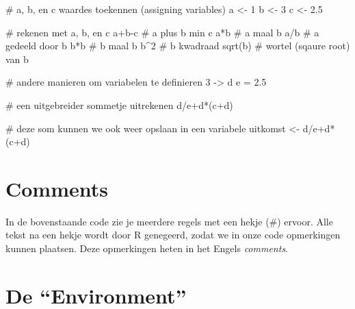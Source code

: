 \documentclass[
  a4paper,
]{scrbook}
\newenvironment{Shaded}{\begin{snugshade}}{\end{snugshade}}
\newcommand{\CommentTok}[1]{\textcolor[rgb]{0.37,0.37,0.37}{#1}}
\newcommand{\DecValTok}[1]{\textcolor[rgb]{0.68,0.00,0.00}{#1}}
\newcommand{\FloatTok}[1]{\textcolor[rgb]{0.68,0.00,0.00}{#1}}
\newcommand{\FunctionTok}[1]{\textcolor[rgb]{0.28,0.35,0.67}{#1}}
\newcommand{\NormalTok}[1]{\textcolor[rgb]{0.00,0.23,0.31}{#1}}
\newcommand{\OtherTok}[1]{\textcolor[rgb]{0.00,0.23,0.31}{#1}}
\newcommand{\SpecialCharTok}[1]{\textcolor[rgb]{0.37,0.37,0.37}{#1}}
\theoremstyle{definition}
\theoremstyle{remark}
\begin{document}
\begin{Shaded}
\begin{Highlighting}[]
\CommentTok{\# a, b, en c waardes toekennen (assigning variables)}
\NormalTok{a }\OtherTok{\textless{}{-}} \DecValTok{1}
\NormalTok{b }\OtherTok{\textless{}{-}} \DecValTok{3}
\NormalTok{c }\OtherTok{\textless{}{-}} \FloatTok{2.5}

\CommentTok{\# rekenen met a, b, en c}
\NormalTok{a}\SpecialCharTok{+}\NormalTok{b}\SpecialCharTok{{-}}\NormalTok{c }\CommentTok{\# a plus b min c}
\NormalTok{a}\SpecialCharTok{*}\NormalTok{b  }\CommentTok{\# a maal b}
\NormalTok{a}\SpecialCharTok{/}\NormalTok{b  }\CommentTok{\# a gedeeld door b}
\NormalTok{b}\SpecialCharTok{*}\NormalTok{b  }\CommentTok{\# b maal b}
\NormalTok{b}\SpecialCharTok{\^{}}\DecValTok{2}  \CommentTok{\# b kwadraad}
\FunctionTok{sqrt}\NormalTok{(b) }\CommentTok{\# wortel (sqaure root) van b}


\CommentTok{\# andere manieren om variabelen te definieren}
\DecValTok{3} \OtherTok{{-}\textgreater{}}\NormalTok{ d}
\NormalTok{e }\OtherTok{=} \FloatTok{2.5}

\CommentTok{\# een uitgebreider sommetje uitrekenen}
\NormalTok{d}\SpecialCharTok{/}\NormalTok{e}\SpecialCharTok{+}\NormalTok{d}\SpecialCharTok{*}\NormalTok{(c}\SpecialCharTok{+}\NormalTok{d)}

\CommentTok{\# deze som kunnen we ook weer opslaan in een variabele}
\NormalTok{uitkomst }\OtherTok{\textless{}{-}}\NormalTok{ d}\SpecialCharTok{/}\NormalTok{e}\SpecialCharTok{+}\NormalTok{d}\SpecialCharTok{*}\NormalTok{(c}\SpecialCharTok{+}\NormalTok{d)}
\end{Highlighting}
\end{Shaded}

\section{Comments}\label{sec-environment}

In de bovenstaande code zie je meerdere regels met een hekje (\#)
ervoor. Alle tekst na een hekje wordt door R genegeerd, zodat we in onze
code opmerkingen kunnen plaatsen. Deze opmerkingen heten in het Engels
\emph{comments}.

\section{De ``Environment''}\label{de-environment}
\end{document}
